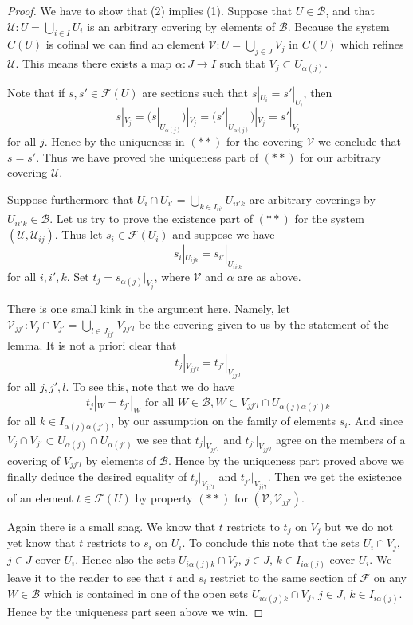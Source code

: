 \begin{proof}
We have to show that (2) implies (1).
Suppose that $U \in \mathcal{B}$, and that
$\mathcal{U} : U = \bigcup_{i\in I} U_i$ is an arbitrary covering
by elements of $\mathcal{B}$.  Because the system $C(U)$ is cofinal
we can find an element $\mathcal{V} : U = \bigcup_{j \in J} V_j$
in $C(U)$ which refines $\mathcal{U}$. This means there exists
a map $\alpha : J \to I$ such that $V_j \subset U_{\alpha(j)}$.

\medskip\noindent
Note that if $s, s' \in \mathcal{F}(U)$ are sections such
that $s|_{U_i} = s'|_{U_i}$, then
$$
s|_{V_j}
= (s|_{U_{\alpha(j)}})|_{V_j}
= (s'|_{U_{\alpha(j)}})|_{V_j}
= s'|_{V_j}
$$
for all $j$. Hence by the uniqueness in $(**)$
for the covering $\mathcal{V}$ we conclude that $s = s'$.
Thus we have proved the uniqueness part of $(**)$
for our arbitrary covering $\mathcal{U}$.

\medskip\noindent
Suppose furthermore that $U_i \cap U_{i'} = \bigcup_{k \in I_{ii'}} U_{ii'k}$
are arbitrary coverings by $U_{ii'k} \in \mathcal{B}$.
Let us try to prove the existence part of $(**)$ for the system
$(\mathcal{U}, \mathcal{U}_{ij})$. Thus let $s_i \in \mathcal{F}(U_i)$
and suppose we have
$$
s_i|_{U_{ijk}} = s_{i'}|_{U_{ii'k}}
$$
for all $i, i', k$. Set $t_j = s_{\alpha(j)}|_{V_j}$, where $\mathcal{V}$
and $\alpha$ are as above.

\medskip\noindent
There is one small kink in the argument here. Namely, let
$\mathcal{V}_{jj'} : V_j \cap V_{j'} = \bigcup_{l \in J_{jj'}} V_{jj'l}$
be the covering given to us by the statement of the lemma.
It is not a priori clear that
$$
t_j|_{V_{jj'l}} = t_{j'}|_{V_{jj'l}}
$$
for all $j, j', l$. To see this, note that we do have
$$
t_j|_W = t_{j'}|_W \text{ for all } W \in \mathcal{B},
W \subset V_{jj'l} \cap U_{\alpha(j)\alpha(j')k}
$$
for all $k \in I_{\alpha(j)\alpha(j')}$, by our assumption on
the family of elements $s_i$. And since
$V_j \cap V_{j'} \subset U_{\alpha(j)} \cap U_{\alpha(j')}$
we see that $t_j|_{V_{jj'l}}$ and $t_{j'}|_{V_{jj'l}}$
agree on the members of a covering of $V_{jj'l}$ by
elements of $\mathcal{B}$. Hence by the uniqueness part proved above
we finally deduce the desired equality of
$t_j|_{V_{jj'l}}$ and $t_{j'}|_{V_{jj'l}}$.
Then we get the existence of an element $t \in \mathcal{F}(U)$
by property $(**)$ for $(\mathcal{V}, \mathcal{V}_{jj'})$.

\medskip\noindent
Again there is a small snag. We know that $t$ restricts to $t_j$ on $V_j$
but we do not yet know that $t$ restricts to $s_i$ on $U_i$. To conclude
this note that the sets $U_i \cap V_j$, $j \in J$ cover $U_i$. Hence
also the sets $U_{i \alpha(j) k} \cap V_j$, $j\in J$, $k \in I_{i\alpha(j)}$
cover $U_i$. We leave it to the reader to see that $t$ and $s_i$ restrict
to the same section of $\mathcal{F}$ on any $W \in \mathcal{B}$
which is contained in one of the open sets
$U_{i \alpha(j) k} \cap V_j$, $j\in J$, $k \in I_{i\alpha(j)}$.
Hence by the uniqueness part seen above we win.
\end{proof}

